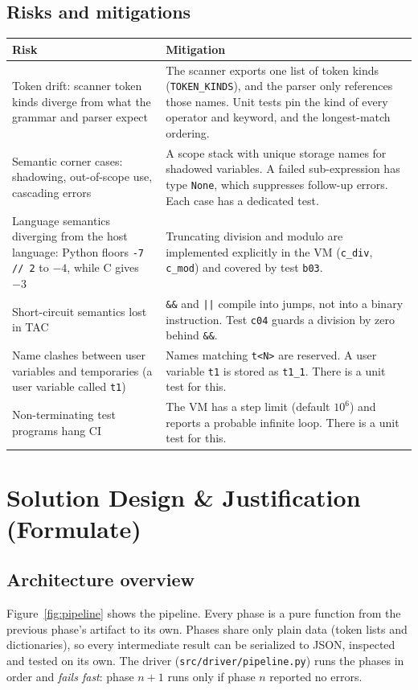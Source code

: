 \documentclass[11pt,letterpaper]{article}
\newcommand{\code}[1]{\texttt{#1}}
\begin{document}
\subsection{Risks and mitigations}
\begin{tabularx}{\linewidth}{>{\raggedright}p{4.2cm} X}
\toprule
\textbf{Risk} & \textbf{Mitigation} \\
\midrule
Token drift: scanner token kinds diverge from what the grammar and parser expect &
The scanner exports one list of token kinds (\code{TOKEN\_KINDS}), and the parser only references those names. Unit tests pin the kind of every operator and keyword, and the longest-match ordering. \\
Semantic corner cases: shadowing, out-of-scope use, cascading errors &
A scope stack with unique storage names for shadowed variables. A failed sub-expression has type \code{None}, which suppresses follow-up errors. Each case has a dedicated test. \\
Language semantics diverging from the host language: Python floors \code{-7 // 2} to $-4$, while C gives $-3$ &
Truncating division and modulo are implemented explicitly in the VM (\code{c\_div}, \code{c\_mod}) and covered by test \code{b03}. \\
Short-circuit semantics lost in TAC &
\code{\&\&} and \code{||} compile into jumps, not into a binary instruction. Test \code{c04} guards a division by zero behind \code{\&\&}. \\
Name clashes between user variables and temporaries (a user variable called \code{t1}) &
Names matching \code{t<N>} are reserved. A user variable \code{t1} is stored as \code{t1\_1}. There is a unit test for this. \\
Non-terminating test programs hang CI &
The VM has a step limit (default $10^6$) and reports a probable infinite loop. There is a unit test for this. \\
\bottomrule
\end{tabularx}

\section{Solution Design \& Justification \textmd{(Formulate)}}

\subsection{Architecture overview}
Figure~\ref{fig:pipeline} shows the pipeline. Every phase is a pure function from the previous phase's artifact to its own. Phases share only plain data (token lists and dictionaries), so every intermediate result can be serialized to JSON, inspected and tested on its own. The driver (\code{src/driver/pipeline.py}) runs the phases in order and \emph{fails fast}: phase $n+1$ runs only if phase $n$ reported no errors.
\end{document}
